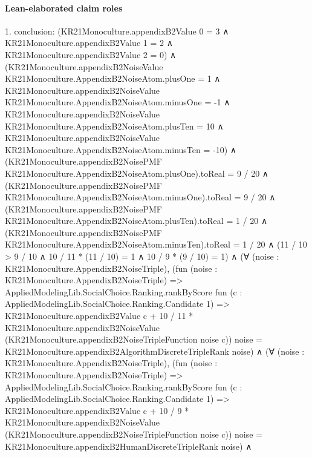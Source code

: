 \documentclass[10pt]{article}
\begin{document}
\paragraph{Lean-elaborated claim roles}\begin{ReviewVerbatim}
1. conclusion: (KR21Monoculture.appendixB2Value 0 = 3 ∧
    KR21Monoculture.appendixB2Value 1 = 2 ∧ KR21Monoculture.appendixB2Value 2 = 0) ∧
  (KR21Monoculture.appendixB2NoiseValue KR21Monoculture.AppendixB2NoiseAtom.plusOne = 1 ∧
      KR21Monoculture.appendixB2NoiseValue KR21Monoculture.AppendixB2NoiseAtom.minusOne = -1 ∧
        KR21Monoculture.appendixB2NoiseValue KR21Monoculture.AppendixB2NoiseAtom.plusTen = 10 ∧
          KR21Monoculture.appendixB2NoiseValue KR21Monoculture.AppendixB2NoiseAtom.minusTen = -10) ∧
    (KR21Monoculture.appendixB2NoisePMF KR21Monoculture.AppendixB2NoiseAtom.plusOne).toReal = 9 / 20 ∧
      (KR21Monoculture.appendixB2NoisePMF KR21Monoculture.AppendixB2NoiseAtom.minusOne).toReal = 9 / 20 ∧
        (KR21Monoculture.appendixB2NoisePMF KR21Monoculture.AppendixB2NoiseAtom.plusTen).toReal = 1 / 20 ∧
          (KR21Monoculture.appendixB2NoisePMF KR21Monoculture.AppendixB2NoiseAtom.minusTen).toReal = 1 / 20 ∧
            (11 / 10 > 9 / 10 ∧ 10 / 11 * (11 / 10) = 1 ∧ 10 / 9 * (9 / 10) = 1) ∧
              (∀ (noise : KR21Monoculture.AppendixB2NoiseTriple),
                  (fun (noise : KR21Monoculture.AppendixB2NoiseTriple) =>
                        AppliedModelingLib.SocialChoice.Ranking.rankByScore
                          fun (c : AppliedModelingLib.SocialChoice.Ranking.Candidate 1) =>
                          KR21Monoculture.appendixB2Value c +
                            10 / 11 *
                              KR21Monoculture.appendixB2NoiseValue
                                (KR21Monoculture.appendixB2NoiseTripleFunction noise c))
                      noise =
                    KR21Monoculture.appendixB2AlgorithmDiscreteTripleRank noise) ∧
                (∀ (noise : KR21Monoculture.AppendixB2NoiseTriple),
                    (fun (noise : KR21Monoculture.AppendixB2NoiseTriple) =>
                          AppliedModelingLib.SocialChoice.Ranking.rankByScore
                            fun (c : AppliedModelingLib.SocialChoice.Ranking.Candidate 1) =>
                            KR21Monoculture.appendixB2Value c +
                              10 / 9 *
                                KR21Monoculture.appendixB2NoiseValue
                                  (KR21Monoculture.appendixB2NoiseTripleFunction noise c))
                        noise =
                      KR21Monoculture.appendixB2HumanDiscreteTripleRank noise) ∧

\end{ReviewVerbatim}
\end{document}
